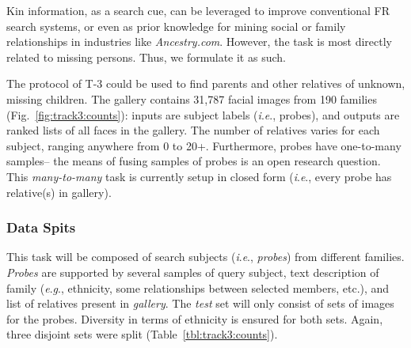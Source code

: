 \documentclass[letterpaper, 10 pt, conference]{ieeeconf}
\newcommand{\ie}{\textit{i}.\textit{e}., }
\newcommand{\eg}{\textit{e}.\textit{g}., }
\begin{document}
Kin information, as a search cue, can be leveraged to improve conventional FR search systems, or even as prior knowledge for mining social or family relationships in industries like \textit{Ancestry.com}. However, the task is most directly related to missing persons. Thus, we formulate it as such.




The protocol of T-3 could be used to find parents and other relatives of unknown, missing children. The gallery contains 31,787 facial images from 190 families (Fig.~\ref{fig:track3:counts}): inputs are subject labels (\ie probes), and outputs are ranked lists of all faces in the gallery. The number of relatives varies for each subject, ranging anywhere from 0 to 20+. Furthermore, probes have one-to-many samples-- the means of fusing samples of probes is an open research question. This \textit{many-to-many} task is currently setup in closed form (\ie every probe has relative(s) in gallery).
%


\subsubsection{Data Spits}
This task will be composed of search subjects (\ie \textit{probes}) from different families. \textit{Probes} are supported by several samples of query subject, text description of family (\eg ethnicity, some relationships between selected members, etc.), and list of relatives present in \textit{gallery}. The \textit{test} set will only consist of sets of images for the probes. Diversity in terms of ethnicity is ensured for both sets. Again, three disjoint sets were split (Table~\ref{tbl:track3:counts}).
\end{document}
